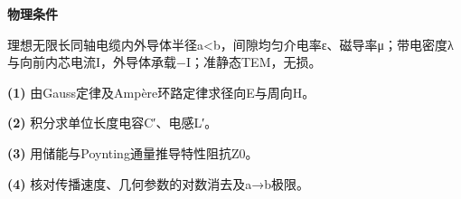 \textbf{物理条件}\par 理想无限长同轴电缆内外导体半径a<b，间隙均匀介电率ε、磁导率μ；带电密度λ与向前内芯电流I，外导体承载−I；准静态TEM，无损。
\par\noindent\textbf{(1)} 由Gauss定律及Ampère环路定律求径向E与周向H。
\par\noindent\textbf{(2)} 积分求单位长度电容C′、电感L′。
\par\noindent\textbf{(3)} 用储能与Poynting通量推导特性阻抗Z0。
\par\noindent\textbf{(4)} 核对传播速度、几何参数的对数消去及a→b极限。
